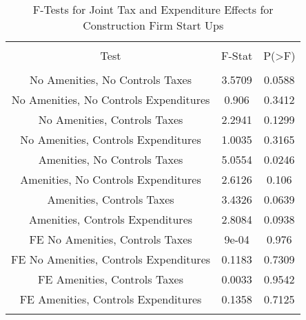 
\begin{table}[!htbp] \centering 
  \caption{F-Tests for Joint Tax and Expenditure Effects for Construction Firm Start Ups} 
  \label{23Ftests} 
\begin{tabular}{@{\extracolsep{5pt}} ccc} 
\\[-1.8ex]\hline 
\hline \\[-1.8ex] 
Test & F-Stat & P(\textgreater F) \\ 
\hline \\[-1.8ex] 
No Amenities, No Controls Taxes & 3.5709 & 0.0588 \\ 
No Amenities, No Controls Expenditures & 0.906 & 0.3412 \\ 
No Amenities, Controls Taxes & 2.2941 & 0.1299 \\ 
No Amenities, Controls Expenditures & 1.0035 & 0.3165 \\ 
Amenities, No Controls Taxes & 5.0554 & 0.0246 \\ 
Amenities, No Controls Expenditures & 2.6126 & 0.106 \\ 
Amenities, Controls Taxes & 3.4326 & 0.0639 \\ 
Amenities, Controls Expenditures & 2.8084 & 0.0938 \\ 
FE No Amenities, Controls Taxes & 9e-04 & 0.976 \\ 
FE No Amenities, Controls Expenditures & 0.1183 & 0.7309 \\ 
FE Amenities, Controls Taxes & 0.0033 & 0.9542 \\ 
FE Amenities, Controls Expenditures & 0.1358 & 0.7125 \\ 
\hline \\[-1.8ex] 
\end{tabular} 
\end{table} 
